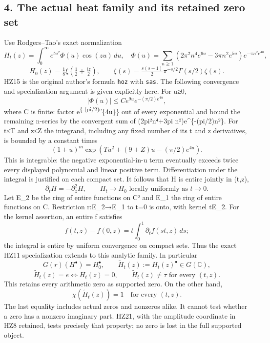 \documentclass[
]{article}
\begin{document}
\subsection{4. The actual heat family and its retained zero
set}\label{the-actual-heat-family-and-its-retained-zero-set}

Use Rodgers--Tao's exact normalization \[
H_t(z)=\int_0^\infty e^{tu^2}\Phi(u)\cos(zu)\,du,
\quad
\Phi(u)=\sum_{n\ge1}(2\pi^2n^4e^{9u}-3\pi n^2e^{5u})
e^{-\pi n^2e^{4u}},
\tag{HZ14}
\] \[
H_0(z)=\tfrac18\xi(\tfrac12+\tfrac{iz}{2}),\qquad
\xi(s)=\tfrac{s(s-1)}2\pi^{-s/2}\Gamma(s/2)\zeta(s).
\tag{HZ15}
\] HZ15 is the original author's formula \texttt{hoz} with \texttt{sas}.
The following convergence and specialization argument is given
explicitly here. For u≥0, \[
|\Phi(u)|\le C e^{9u}e^{-(\pi/2)e^{4u}},
\tag{HZ16}
\] where C is finite: factor e\textsuperscript{\{-(pi/2)e}\{4u\}\} out
of every exponential and bound the remaining n-series by the convergent
sum of (2pi²n⁴+3pi n²)e\^{}\{-(pi/2)n²\}. For \textbar t\textbar≤T and
\textbar z\textbar≤Z the integrand, including any fixed number of its t
and z derivatives, is bounded by a constant times \[
(1+u)^m\exp(Tu^2+(9+Z)u-(\pi/2)e^{4u}).
\tag{HZ17}
\] This is integrable: the negative exponential-in-u term eventually
exceeds twice every displayed polynomial and linear positive term.
Differentiation under the integral is justified on each compact set. It
follows that H is entire jointly in (t,z), \[
\partial_tH=-\partial_z^2H,\qquad
H_t\longrightarrow H_0\text{ locally uniformly as }t\to0.
\tag{HZ18}
\] Let E\_2 be the ring of entire functions on C² and E\_1 the ring of
entire functions on C. Restriction r:E\_2→E\_1 to t=0 is onto, with
kernel tE\_2. For the kernel assertion, an entire f satisfies \[
f(t,z)-f(0,z)=t\int_0^1\partial_tf(st,z)\,ds;
\tag{HZ19}
\] the integral is entire by uniform convergence on compact sets. Thus
the exact HZ11 specialization extends to this analytic family. In
particular \[
G(r)(H^\bullet)=H_0^\bullet,\qquad
\widetilde H_t(z):=H_t(z)^\bullet\in G(\mathbb C),
\tag{HZ20}
\] \[
\widetilde H_t(z)=e\iff H_t(z)=0,
\qquad\widetilde H_t(z)\ne\tau\text{ for every }(t,z).
\tag{HZ21}
\] This retains every arithmetic zero as supported zero. On the other
hand, \[
\chi(\widetilde H_t(z))=1\quad\text{for every }(t,z).
\tag{HZ22}
\] The last equality includes actual zeros and nonzeros alike. It cannot
test whether a zero has a nonzero imaginary part. HZ21, with the
amplitude coordinate in HZ8 retained, tests precisely that property; no
zero is lost in the full supported object.
\end{document}
